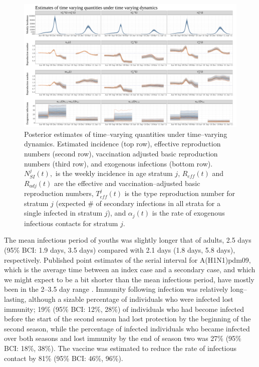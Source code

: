 \begin{figure}
	\centering
	\includegraphics[width=0.95\linewidth]{figures/flu_rw_ode_timevarying_plots}
	\caption[Estimated A(H1N1) incidence, reproduction numbers, and rates of exogenous infection under time--varying dynamics.]{Posterior estimates of time--varying quantities under time--varying dynamics. Estimated incidence (top row), effective reproduction numbers (second row), vaccination adjusted basic reproduction numbers (third row), and exogenous infections (bottom row). $ N_{SI}^j(t), $ is the weekly incidence in age stratum $ j $, $ R_{eff}(t) $ and $ R_{adj}(t) $ are the effective and vaccination--adjusted basic reproduction numbers, $ T_{eff}^j(t) $ is the type reproduction number for stratum $ j $ (expected \# of secondary infections in all strata for a single infected in stratum $ j $), and $ \alpha_j(t) $ is the rate of exogenous infectious contacts for stratum $ j $.}
	\label{fig:flurwodetimevaryingplots}
\end{figure}

The mean infectious period of youths was slightly longer that of adults, 2.5 days (95\% BCI: 1.9 days, 3.5 days) compared with 2.1 days (1.8 days, 5.8 days), respectively. Published point estimates of the serial interval for A(H1N1)pdm09, which is the average time between an index case and a secondary case, and which we might expect to be a bit shorter than the mean infectious period, have mostly been in the 2--3.5 day range \cite{vink2014serial}. Immunity following infection was relatively long--lasting, although a sizable percentage of individuals who were infected lost immunity; 19\% (95\% BCI: 12\%, 28\%) of individuals who had become infected before the start of the second season had lost protection by the beginning of the second season, while the percentage of infected individuals who became infected over both seasons and lost immunity by the end of season two was 27\% (95\% BCI: 18\%, 38\%). The vaccine was estimated to reduce the rate of infectious contact by 81\% (95\% BCI: 46\%, 96\%). 

